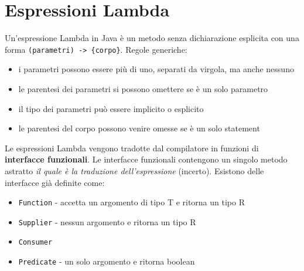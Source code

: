 \section{Espressioni Lambda}
Un'espressione Lambda in Java è un metodo senza dichiarazione esplicita con una forma \texttt{(parametri) -> \{corpo\}}.
Regole generiche:
\begin{itemize}
\item i parametri possono essere più di uno, separati da virgola, ma anche nessuno
\item le parentesi dei parametri si possono omettere se è un solo parametro
\item il tipo dei parametri può essere implicito o esplicito
\item le parentesi del corpo possono venire omesse se è un solo statement
\end{itemize}
Le espressioni Lambda vengono tradotte dal compilatore in funzioni di \textbf{interfacce funzionali}. Le interfacce funzionali contengono un singolo metodo astratto \textit{il quale è la traduzione dell'espressione} (incerto). Esistono delle interfacce già definite come:
\begin{itemize}
\item \texttt{Function} - accetta un argomento di tipo T e ritorna un tipo R
\item \texttt{Supplier} - nessun argomento e ritorna un tipo R
\item \texttt{Consumer} 
\item \texttt{Predicate} - un solo argomento e ritorna boolean 
\end{itemize}

